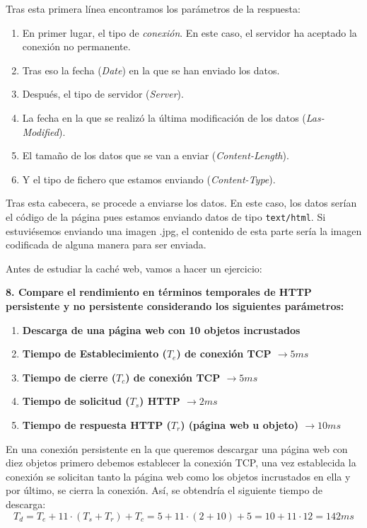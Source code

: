 \documentclass[10pt,a4paper,spanish]{report}
\begin{document}
\begin{description}
  Tras esta primera línea encontramos los parámetros de la respuesta:
  \begin{enumerate}[\color{tema2}{$\leadsto$}]
    \item En primer lugar, el tipo de \textit{\textcolor{tema2}{conexión}}. En este caso, el servidor ha aceptado la conexión no permanente.
    \item Tras eso la fecha (\textcolor{tema2}{\textit{Date}}) en la que se han enviado los datos.
    \item Después, el tipo de servidor (\textcolor{tema2}{\textit{Server}}).
    \item La fecha en la que se realizó la última modificación de los datos (\textcolor{tema2}{\textit{Las-Modified}}).
    \item El tamaño de los datos que se van a enviar (\textit{\textcolor{tema2}{Content-Length}}).
    \item Y el tipo de fichero que estamos enviando (\textit{\textcolor{tema2}{Content-Type}}).
  \end{enumerate}

  Tras esta cabecera, se procede a enviarse los datos. En este caso, los datos serían el código de la página pues estamos enviando datos de tipo \texttt{text/html}. Si estuviésemos enviando una imagen .jpg, el contenido de esta parte sería la imagen codificada de alguna manera para ser enviada.

\end{description}

Antes de estudiar la caché web, vamos a hacer un ejercicio:

\textbf{8. Compare el rendimiento en términos temporales de HTTP persistente y no persistente considerando los siguientes parámetros:}

\begin{enumerate}[---]
  \item \textbf{Descarga de una página web con 10 objetos incrustados}
  \item \textbf{Tiempo de Establecimiento ($T_e$) de conexión TCP $\rightarrow 5ms$}
  \item \textbf{Tiempo de cierre ($T_c$) de conexión TCP $\rightarrow 5ms$}
  \item \textbf{Tiempo de solicitud ($T_s$) HTTP $\rightarrow 2ms$}
  \item \textbf{Tiempo de respuesta HTTP ($T_r$) (página web u objeto) $\rightarrow 10ms$} 
\end{enumerate}

En una conexión persistente en la que queremos descargar una página web con diez objetos primero debemos establecer la conexión TCP, una vez establecida la conexión se solicitan tanto la página web como los objetos incrustados en ella y por último, se cierra la conexión. Así, se obtendría el siguiente tiempo de descarga:
\begin{displaymath}
  T_d = T_e + 11 \cdot (T_s + T_r) + T_c = 5 + 11 \cdot (2 + 10) + 5 = 10 + 11 \cdot 12 = 142 ms
\end{displaymath}
\end{document}
